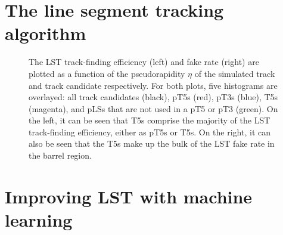\section{The line segment tracking algorithm}

\begin{figure}[!htb]
  \centering
  \qquad
  \caption{
      The LST track-finding efficiency (left) and fake rate (right) are plotted as a function of the pseudorapidity $\eta$ of the simulated track and track candidate respectively.
      For both plots, five histograms are overlayed: all track candidates (black), pT5s (red), pT3s (blue), T5s (magenta), and pLSs that are not used in a pT5 or pT3 (green).
      On the left, it can be seen that T5s comprise the majority of the LST track-finding efficiency, either as pT5s or T5s.
      On the right, it can also be seen that the T5s make up the bulk of the LST fake rate in the barrel region.
  }
  \label{fig:lst_performance}
\end{figure}

\section{Improving LST with machine learning}

